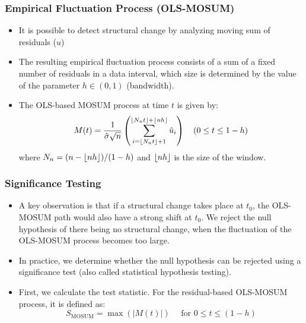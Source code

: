 \documentclass[9pt]{beamer}
\DeclarePairedDelimiter\floor{\lfloor}{\rfloor}
\begin{document}
\begin{frame}
  \frametitle{Empirical Fluctuation Process (OLS-MOSUM)}
  \begin{itemize}
  \item It is possible to detect structural change by analyzing moving sum of residuals ($\hat{u}$)
  \item 
    The resulting empirical fluctuation process consists of a
    sum of a fixed number of residuals in a data interval, which size is determined
    by the value of the parameter $h \in (0,1)$ (bandwidth).
  \item 
  The OLS-based MOSUM process at time $t$ is given by:
  \begin{equation}\label{eq:mosum_og}
    M(t)=\frac{1}{\hat{\sigma} \sqrt{n}}
    \left(\sum_{i=\floor{N_{n} t}+1}^{\left\lfloor N_{n} t\right\rfloor+\lfloor
      n h\rfloor} \hat{u}_{i}\right) \quad(0 \leq t \leq 1-h)
  \end{equation}
  where $N_{n}=(n-\floor{n h}) /(1-h)$ and $\floor{n h}$ is the size of the
  window. 
  \end{itemize}
\end{frame}

\begin{frame}
  \frametitle{Significance Testing}
  \begin{itemize}
  \item 
    A key observation is that if a structural change takes place at $t_0$, the
    OLS-MOSUM path would also have a strong shift at $t_0$.
    We reject the null hypothesis of there being no structural change, when the fluctuation of
    the OLS-MOSUM process becomes too large.
  \item
    In practice, we determine whether the null
    hypothesis can be rejected using a significance test (also called statistical
    hypothesis testing).
  \item 
    First, we calculate the test statistic. For the residual-based OLS-MOSUM
    process, it is defined as:
    \begin{equation} \label{eq:test_statistic_og}
      S_{\text{MOSUM}} = \max(|M(t)|) \quad \text{ for } 0 \leq t \leq (1-h)
    \end{equation}
  \end{itemize}
\end{frame}
\end{document}
